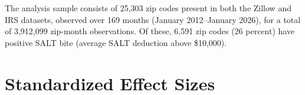 \documentclass[12pt]{article}
\begin{document}
The analysis sample consists of 25,303 zip codes present in both the Zillow and IRS datasets, observed over 169 months (January 2012--January 2026), for a total of 3,912,099 zip-month observations. Of these, 6,591 zip codes (26 percent) have positive SALT bite (average SALT deduction above \$10,000).

\section{Standardized Effect Sizes}
\label{sec:sde}

{\small

}
\end{document}
